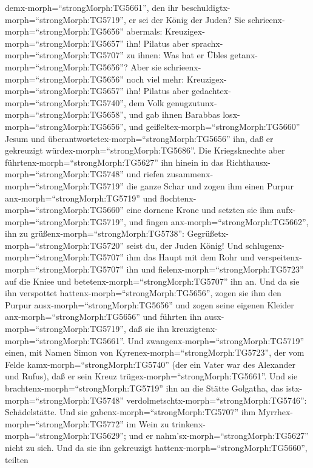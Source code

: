 demx-morph=``strongMorph:TG5661'', den ihr
beschuldigtx-morph=``strongMorph:TG5719'', er sei der König der Juden?
 Sie schrieenx-morph=``strongMorph:TG5656'' abermals:
Kreuzigex-morph=``strongMorph:TG5657'' ihn!  Pilatus aber
sprachx-morph=``strongMorph:TG5707'' zu ihnen: Was hat er Übles
getanx-morph=``strongMorph:TG5656''? Aber sie
schrieenx-morph=``strongMorph:TG5656'' noch viel mehr:
Kreuzigex-morph=``strongMorph:TG5657'' ihn!  Pilatus aber
gedachtex-morph=``strongMorph:TG5740'', dem Volk
genugzutunx-morph=``strongMorph:TG5658'', und gab ihnen Barabbas
losx-morph=``strongMorph:TG5656'', und
geißeltex-morph=``strongMorph:TG5660'' Jesum und
überantwortetex-morph=``strongMorph:TG5656'' ihn, daß er gekreuzigt
würdex-morph=``strongMorph:TG5686''.  Die Kriegsknechte
aber führtenx-morph=``strongMorph:TG5627'' ihn hinein in das
Richthausx-morph=``strongMorph:TG5748'' und riefen
zusammenx-morph=``strongMorph:TG5719'' die ganze Schar  und
zogen ihm einen Purpur anx-morph=``strongMorph:TG5719'' und
flochtenx-morph=``strongMorph:TG5660'' eine dornene Krone und setzten
sie ihm aufx-morph=``strongMorph:TG5719'',  und fingen
anx-morph=``strongMorph:TG5662'', ihn zu
grüßenx-morph=``strongMorph:TG5738'':
Gegrüßetx-morph=``strongMorph:TG5720'' seist du, der Juden König!
 Und schlugenx-morph=``strongMorph:TG5707'' ihm das Haupt
mit dem Rohr und verspeitenx-morph=``strongMorph:TG5707'' ihn und
fielenx-morph=``strongMorph:TG5723'' auf die Kniee und
betetenx-morph=``strongMorph:TG5707'' ihn an.  Und da sie
ihn verspottet hattenx-morph=``strongMorph:TG5656'', zogen sie ihm den
Purpur ausx-morph=``strongMorph:TG5656'' und zogen seine eigenen Kleider
anx-morph=``strongMorph:TG5656'' und führten ihn
ausx-morph=``strongMorph:TG5719'', daß sie ihn
kreuzigtenx-morph=``strongMorph:TG5661''.  Und
zwangenx-morph=``strongMorph:TG5719'' einen, mit Namen Simon von
Kyrenex-morph=``strongMorph:TG5723'', der vom Felde
kamx-morph=``strongMorph:TG5740'' (der ein Vater war des Alexander und
Rufus), daß er sein Kreuz trügex-morph=``strongMorph:TG5661''.
 Und sie brachtenx-morph=``strongMorph:TG5719'' ihn an die
Stätte Golgatha, das istx-morph=``strongMorph:TG5748''
verdolmetschtx-morph=``strongMorph:TG5746'': Schädelstätte.
 Und sie gabenx-morph=``strongMorph:TG5707'' ihm
Myrrhex-morph=``strongMorph:TG5772'' im Wein zu
trinkenx-morph=``strongMorph:TG5629''; und er
nahm'sx-morph=``strongMorph:TG5627'' nicht zu sich.  Und da
sie ihn gekreuzigt hattenx-morph=``strongMorph:TG5660'', teilten
